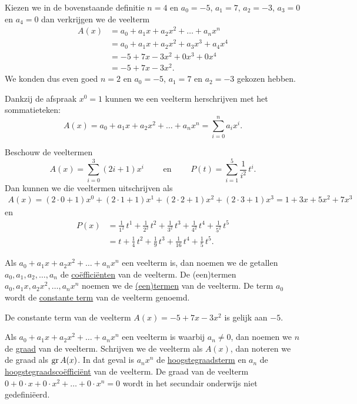 \documentclass{ximera}
\begin{document}
\begin{example} 
Kiezen we in de bovenstaande definitie $n = 4$ en $a_0 = -5$, $a_1 = 7$, $a_2 = -3$, $a_3 = 0$ en $a_4 = 0$ dan verkrijgen we de veelterm
\begin{align*}
A(x) 
& = a_0 + a_1x + a_2x^2 + \dots + a_n x^n \\
& = a_0 + a_1x + a_2x^2 + a_3 x^3 + a_4 x^4 \\ 
& = -5 + 7x - 3x^2 + 0x^3 + 0x^4 \\
& = -5 + 7x - 3x^2.
\end{align*}
We konden dus even goed $n = 2$ en $a_0 = -5$, $a_1 = 7$ en $a_2 = -3$ gekozen hebben. 
\end{example} 

Dankzij de afspraak $x^0 = 1$ kunnen we een veelterm herschrijven met het sommatieteken:
\[
A(x) = a_0 + a_1x + a_2x^2 + \dots + a_n x^n = \sum_{i=0}^n a_i x^i.
\]

\begin{example} 
Beschouw de veeltermen
\[
A(x) = \sum_{i=0}^3 (2i+1) x^i \qquad \text{ en } \qquad P(t) = \sum_{i=1}^5 \frac{1}{i^2} \, t^i.
\] 
Dan kunnen we die veeltermen uitschrijven als
\begin{align*}
A(x)  = (2\cdot0+1)x^0 + (2\cdot1+1)x^1 + (2\cdot2+1)x^2 + (2\cdot3+1)x^3 = 1 + 3x + 5x^2 + 7x^3
\end{align*}
en
\begin{align*}
P(x) 
& = \frac{1}{1^2} \, t^1 + \frac{1}{2^2} \, t^2 + \frac{1}{3^2} \, t^3 + \frac{1}{4^2} \, t^4 + \frac{1}{5^2} \, t^5 \\
& = t + \frac{1}{4}\,t^2 + \frac{1}{9}\,t^3 + \frac{1}{16}\,t^4 + \frac{1}{5}\,t^5.
\end{align*}
\end{example} 

Als $a_0 + a_1x + a_2x^2 + \dots + a_n x^n$ een veelterm is, dan noemen we de getallen $a_0, a_1, a_2, \ldots, a_n$ de \underline{co\"effici\"enten} van de veelterm. De (een)termen $a_0, a_1x, a_2x^2, \ldots , a_nx^n$ noemen we de \underline{(een)termen} van de veelterm. De term $a_0$ wordt de \underline{constante term} van de veelterm genoemd.

\begin{example} 
De constante term van de veelterm $A(x) = -5 + 7x - 3x^2$ is gelijk aan $-5$.  
\end{example} 

Als $a_0 + a_1x + a_2x^2 + \dots + a_n x^n$ een veelterm is waarbij $a_n \neq 0$, dan noemen we $n$ de \underline{graad} van de veelterm. Schrijven we de veelterm als $A(x)$, dan noteren we de graad als $\operatorname{gr} A(x)$. In dat geval is $a_nx^n$ de \underline{hoogstegraadsterm} en $a_n$ de \underline{hoogstegraadsco\"effici\"ent} van de veelterm. De graad van de veelterm $0 + 0\cdot x + 0 \cdot x^2 + \dots + 0\cdot x^n = 0$ wordt in het secundair onderwijs niet gedefini\"eerd.
\end{document}
